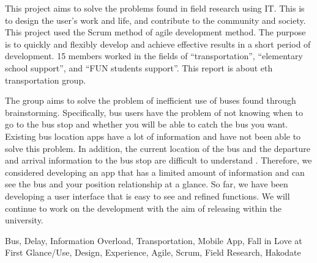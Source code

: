 \documentclass[openany,11pt,papersize,dvipdfm]{jsbook}
\begin{document}
\begin{eabstract}
    This project aims to solve the problems found in field research using IT.
    This is to design the user's work and life, and contribute to the community and society.
    This project used the Scrum method of agile development method.
    The purpose is to quickly and flexibly develop and achieve effective results in a short period of development.
    15 members worked in the fields of ``transportation'', ``elementary school support'', and ``FUN students support''.
    This report is about eth transportation group.

    The group aims to solve the problem of inefficient use of buses found through brainstorming.
    Specifically, bus users have the problem of not knowing when to go to the bus stop and whether you will be able to catch the bus you want.
    Existing bus location apps have a lot of information and have not been able to solve this problem.
    In addition, the current location of the bus and the departure and arrival information to the bus stop are difficult to understand .
    Therefore, we considered developing an app that has a limited amount of information and can see the bus and your position relationship at a glance.
    So far, we have been developing a user interface that is easy to see and refined functions.
    We will continue to work on the development with the aim of releasing within the university.

\begin{ekeyword}
Bus, Delay, Information Overload, Transportation, Mobile App, Fall in Love at First Glance/Use, Design, Experience, Agile, Scrum, Field Research, Hakodate
\end{ekeyword}
\end{eabstract}

\tableofcontents

\mainmatter








\begin{appendix}


\end{appendix}


\end{document}
